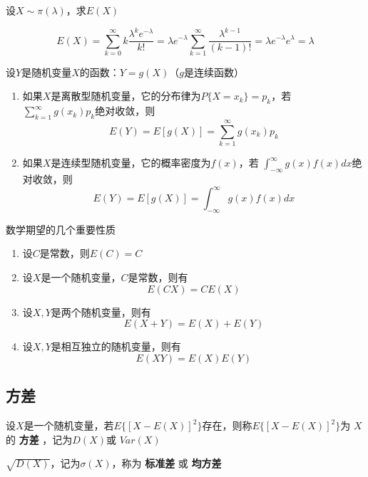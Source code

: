 \documentclass[11pt]{article}
\begin{document}
\begin{examplle}[]
设\(X\sim\pi(\lambda)\)，求\(E(X)\)

\begin{equation*}
E(X)=\sum_{k=0}^\infty k\frac{\lambda^ke^{-\lambda}}{k!}=\lambda e^{-\lambda}
\sum_{k=1}^\infty\frac{\lambda^{k-1}}{(k-1)!}=\lambda e^{-\lambda }e^{\lambda}=\lambda
\end{equation*}
\end{examplle}

\begin{theorem}[]
设\(Y\)是随机变量\(X\)的函数：\(Y=g(X)\)（\(g\)是连续函数）
\begin{enumerate}
\item 如果\(X\)是离散型随机变量，它的分布律为\(P\{X=x_k\}=p_k\)，若
\(\sum_{k=1}^\infty g(x_k)p_k\)绝对收敛，则
\begin{equation*}
E(Y)=E[g(X)]=\sum_{k=1}^\infty g(x_k)p_k
\end{equation*}
\item 如果\(X\)是连续型随机变量，它的概率密度为\(f(x)\)，若
\(\int_{-\infty}^\infty g(x)f(x)dx\)绝对收敛，则
\begin{equation*}
E(Y)=E[g(X)]=\int_{-\infty}^\infty g(x)f(x)dx
\end{equation*}
\end{enumerate}
\end{theorem}

数学期望的几个重要性质
\begin{enumerate}
\item 设\(C\)是常数，则\(E(C)=C\)
\item 设\(X\)是一个随机变量，\(C\)是常数，则有
\begin{equation*}
E(CX)=CE(X)
\end{equation*}
\item 设\(X,Y\)是两个随机变量，则有
\begin{equation*}
E(X+Y)=E(X)+E(Y)
\end{equation*}
\item 设\(X,Y\)是相互独立的随机变量，则有
\begin{equation*}
E(XY)=E(X)E(Y)
\end{equation*}
\end{enumerate}
\subsection{方差}
\label{sec:org01da106}
\begin{definition}[]
设\(X\)是一个随机变量，若\(E\{[X-E(X)]^2\}\)存在，则称\(E\{[X-E(X)]^2\}\)为
\(X\)的 \textbf{方差} ，记为\(D(X)\)或 \(Var(X)\)

\(\sqrt{D(X)}\)，记为\(\sigma(X)\)，称为 \textbf{标准差} 或 \textbf{均方差}
\end{definition}
\end{document}
